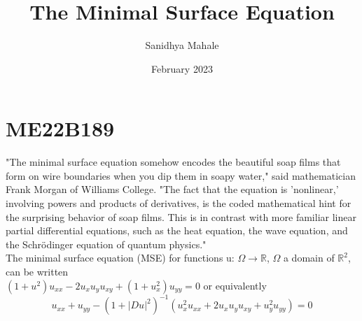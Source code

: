\documentclass[11pt,a4paper]{article}
\begin{document}
\title{The Minimal Surface Equation}
\author{Sanidhya Mahale}
\date{February 2023}
\maketitle
\section{ME22B189}
"The minimal surface equation somehow encodes the beautiful soap films that form on wire boundaries when you dip them in soapy water," said mathematician Frank Morgan of Williams College. "The fact that the equation is 'nonlinear,' involving powers and products of derivatives, is the coded mathematical hint for the surprising behavior of soap films. This is in contrast with more familiar linear partial differential equations, such as the heat equation, the wave equation, and the Schrödinger equation of quantum physics."
\\
The minimal surface equation (MSE) \cite{Simon1997} for functions u: $\Omega \rightarrow \mathbb{R}$,  $\Omega$ a domain of $\mathbb{R}^2$, can be written
\\
$\left( {1 + u_{}^2} \right){u_{xx}} - 2{u_x}{u_y}{u_{xy}} + \left( {1 + u_x^2} \right){u_{yy}} = 0$
or equivalently
\begin{equation}
 {u_{xx}} + {u_{yy}} - {\left( {1 + |Du{|^2}} \right)^{ - 1}}\left( {u_x^2{u_{xx}} + 2{u_x}{u_y}{u_{xy}} + u_y^2{u_{yy}}} \right) = 0  
\end{equation}
 
\end{document}
